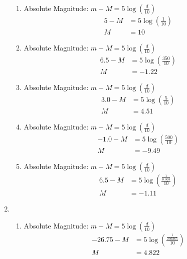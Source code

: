 \documentclass{article}
\begin{document}
\begin{enumerate}
\begin{enumerate}
        \item
        
        Absolute Magnitude: $m-M = 5\log(\frac{d}{10})$
        \begin{align*}
            5 - M &= 5\log(\frac{1}{10})\\
            M &= 10
        \end{align*}
        
        \item
        
        Absolute Magnitude: $m-M = 5\log(\frac{d}{10})$
        \begin{align*}
            6.5 - M &= 5\log(\frac{350}{10})\\
            M &= -1.22
        \end{align*}
        
        \item
        
        Absolute Magnitude: $m-M = 5\log(\frac{d}{10})$
        \begin{align*}
            3.0 - M &= 5\log(\frac{5}{10})\\
            M &= 4.51
        \end{align*}
        
        \item
        
        Absolute Magnitude: $m-M = 5\log(\frac{d}{10})$
        \begin{align*}
            -1.0 - M &= 5\log(\frac{500}{10})\\
            M &= -9.49
        \end{align*}
        
        \item
        
        Absolute Magnitude: $m-M = 5\log(\frac{d}{10})$
        \begin{align*}
            6.5 - M &= 5\log(\frac{\frac{1}{0.003}}{10})\\
            M &= -1.11
        \end{align*}
        
    \end{enumerate}
    
    \item
    
    \begin{enumerate}
        \item 
        
        Absolute Magnitude: $m-M = 5\log(\frac{d}{10})$
        \begin{align*}
            -26.75 - M &= 5\log(\frac{\frac{1}{206265}}{10})\\
            M &= 4.822
        \end{align*}
        

\end{enumerate}
\end{enumerate}
\end{document}
